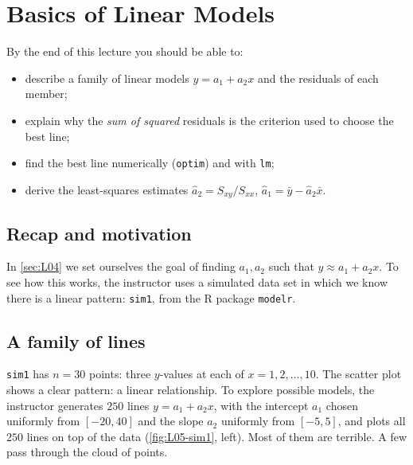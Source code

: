 \section{Basics of Linear Models}\label{sec:L05}


\begin{guiding*}
By the end of this lecture you should be able to:
\begin{itemize}
  \item describe a family of linear models $y=a_1+a_2x$ and the residuals of each member;
  \item explain why the \emph{sum of squared} residuals is the criterion used to choose the best line;
  \item find the best line numerically (\texttt{optim}) and with \texttt{lm};
  \item derive the least-squares estimates $\hat a_2=S_{xy}/S_{xx}$, $\hat a_1=\bar y-\hat a_2\bar x$.
\end{itemize}
\end{guiding*}

\subsection{Recap and motivation}
In \cref{sec:L04} we set ourselves the goal of finding $a_1,a_2$ such that $y\approx a_1+a_2x$.
To see how this works, the instructor uses a simulated data set in which we know there is a
linear pattern: \texttt{sim1}, from the R package \texttt{modelr}.

\subsection{A family of lines}
\begin{example}\label{ex:L05-sim1}
\texttt{sim1} has $n=30$ points: three $y$-values at each of $x=1,2,\dots,10$. The scatter plot
shows a clear pattern: a linear relationship. To explore possible models, the instructor
generates $250$ lines $y=a_1+a_2x$, with the intercept $a_1$ chosen uniformly from $[-20,40]$ and
the slope $a_2$ uniformly from $[-5,5]$, and plots all $250$ lines on top of the data
(\cref{fig:L05-sim1}, left). Most of them are terrible. A few pass through the cloud of points.
\end{example}

